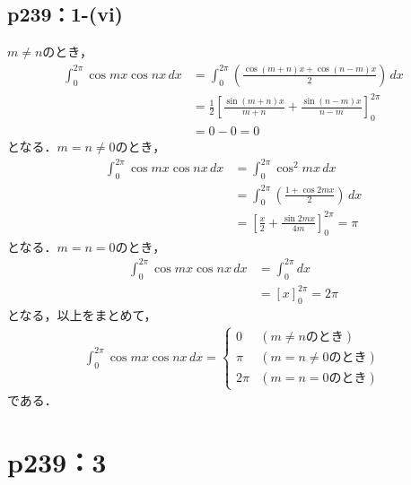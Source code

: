 \subsection*{p239：1-(vi)}
\begin{tanswer}
    $m \ne n$のとき，
    \begin{align*}
        \int_{0}^{2\pi} \cos mx \cos nx \, dx & = \int_{0}^{2\pi} \left (\frac{\cos(m+n)x+\cos(n-m)x}{2}\right) \, dx                 \\
                                              & = \frac{1}{2} \left [\frac{\sin (m+n)x}{m+n}+\frac{\sin(n-m)x}{n-m}\right]_{0}^{2\pi} \\
                                              & = 0-0 =0
    \end{align*}
    となる．$m =n \ne 0$のとき，
    \begin{align*}
        \int_{0}^{2\pi} \cos mx \cos nx \, dx & = \int_{0}^{2\pi} \cos^2 mx \, dx                                \\
                                              & = \int_{0}^{2\pi} \left (\frac{1+\cos 2mx}{2}\right) \, dx       \\
                                              & = \left [\frac{x}{2}+\frac{\sin 2mx}{4m}\right]_{0}^{2\pi} = \pi
    \end{align*}
    となる．$m =n =0$のとき，
    \begin{align*}
        \int_{0}^{2\pi} \cos mx \cos nx \, dx & = \int_{0}^{2\pi} dx    \\
                                              & = [x]_{0}^{2\pi} = 2\pi
    \end{align*}
    となる，以上をまとめて，
    \begin{align*}
        \int_{0}^{2\pi} \cos mx \cos nx \, dx =
        \begin{cases}
            0     & (m \ne n のとき)   \\
            \pi   & (m = n\ne 0のとき) \\
            2 \pi & (m=n=0 のとき)
        \end{cases}
    \end{align*}
    である．
\end{tanswer}

\section*{p239：3}

